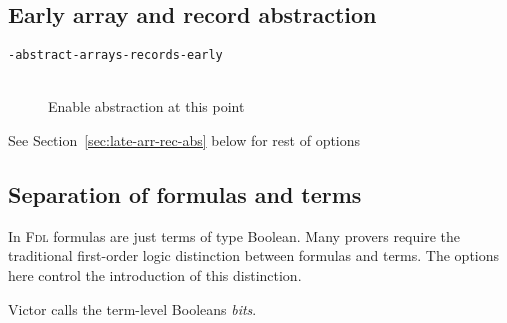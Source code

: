 \documentclass[12pt,fleqn]{article}
\newcommand{\fdl}{\textsc{Fdl}}
\newcommand{\optionb}[1]{\item[\texttt{-{#1}}]\ \\}
\begin{document}
\subsection{Early array and record abstraction}

\begin{description}
\optionb{abstract-arrays-records-early} Enable abstraction at this point
\end{description}
See Section~\ref{sec:late-arr-rec-abs} below for rest of options

\subsection{Separation of formulas and terms}

In \fdl{} formulas are just terms of type Boolean.   Many provers require
the traditional first-order logic distinction between formulas and terms.
%
The options here control the introduction of this distinction.

Victor calls the term-level Booleans \emph{bits}.
\end{document}
